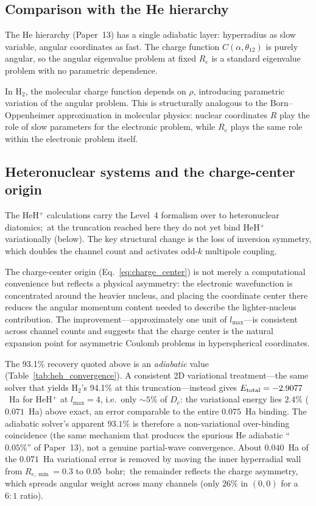 \documentclass[aps,pra,twocolumn,superscriptaddress,longbibliography]{revtex4-2}
\begin{document}
\subsection{Comparison with the He hierarchy}

The He hierarchy (Paper~13) has a single adiabatic layer: hyperradius
as slow variable, angular coordinates as fast.  The charge function
$C(\alpha,\theta_{12})$ is purely angular, so the angular eigenvalue
problem at fixed $R_e$ is a standard eigenvalue problem with no
parametric dependence.

In H$_2$, the molecular charge function depends on $\rho$, introducing
parametric variation of the angular problem.  This is structurally
analogous to the Born--Oppenheimer approximation in molecular physics:
nuclear coordinates $R$ play the role of slow parameters for the
electronic problem, while $R_e$ plays the same role within the
electronic problem itself.

\subsection{Heteronuclear systems and the charge-center origin}

The HeH$^+$ calculations carry the Level~4 formalism over to
heteronuclear diatomics;\ at the truncation reached here they do not
yet bind HeH$^+$ variationally (below).  The key
structural change is the loss of inversion symmetry, which doubles
the channel count and activates odd-$k$ multipole coupling.

The charge-center origin (Eq.~\ref{eq:charge_center}) is not merely
a computational convenience but reflects a physical asymmetry: the
electronic wavefunction is concentrated around the heavier nucleus,
and placing the coordinate center there reduces the angular momentum
content needed to describe the lighter-nucleus contribution.
The improvement---approximately one unit of $l_{\max}$---is
consistent across channel counts and suggests that the charge
center is the natural expansion point for asymmetric Coulomb
problems in hyperspherical coordinates.

The 93.1\% recovery quoted above is an \emph{adiabatic} value
(Table~\ref{tab:heh_convergence}).  A consistent 2D variational
treatment---the same solver that yields H$_2$'s 94.1\% at this
truncation---instead gives $E_{\rm total} = -2.9077$~Ha for HeH$^+$
at $l_{\max}=4$, i.e.\ only ${\sim}5\%$ of $D_e$: the variational
energy lies $2.4\%$ ($0.071$~Ha) above exact, an error comparable to
the entire $0.075$~Ha binding.  The adiabatic solver's apparent
$93.1\%$ is therefore a non-variational over-binding coincidence
(the same mechanism that produces the spurious He adiabatic
``$0.05\%$'' of Paper~13), not a genuine partial-wave convergence.
About $0.040$~Ha of the $0.071$~Ha variational error is removed by
moving the inner hyperradial wall from $R_{e,\min} = 0.3$ to
$0.05$~bohr;\ the remainder reflects the charge asymmetry, which spreads
angular weight across many channels (only $26\%$ in $(0,0)$ for a
$6{:}1$ ratio).
\end{document}
